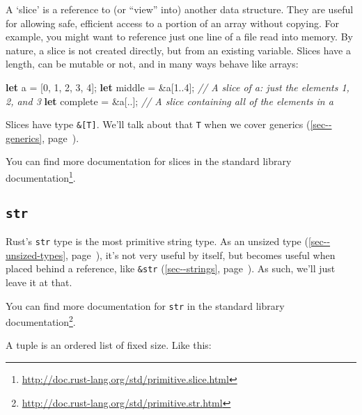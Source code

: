 \documentclass[a4paper,]{book}
\renewcommand*{\hyperref}[2][\ar]{%
  \def\ar{#2}%
  #2 (\autoref{#1}, page~\pageref{#1})}
\newenvironment{Shaded}{\begin{snugshade}}{\end{snugshade}}
\newcommand{\KeywordTok}[1]{\textcolor[rgb]{0.13,0.29,0.53}{\textbf{{#1}}}}
\newcommand{\DecValTok}[1]{\textcolor[rgb]{0.00,0.00,0.81}{{#1}}}
\newcommand{\CommentTok}[1]{\textcolor[rgb]{0.56,0.35,0.01}{\textit{{#1}}}}
\newcommand{\NormalTok}[1]{{#1}}
\renewcommand{\href}[2]{#2\footnote{\url{#1}}}
\begin{document}
A `slice' is a reference to (or ``view'' into) another data structure.
They are useful for allowing safe, efficient access to a portion of an
array without copying. For example, you might want to reference just one
line of a file read into memory. By nature, a slice is not created
directly, but from an existing variable. Slices have a length, can be
mutable or not, and in many ways behave like arrays:

\begin{Shaded}
\begin{Highlighting}[]
\KeywordTok{let} \NormalTok{a = [}\DecValTok{0}\NormalTok{, }\DecValTok{1}\NormalTok{, }\DecValTok{2}\NormalTok{, }\DecValTok{3}\NormalTok{, }\DecValTok{4}\NormalTok{];}
\KeywordTok{let} \NormalTok{middle = &a[}\DecValTok{1.}\NormalTok{.}\DecValTok{4}\NormalTok{]; }\CommentTok{// A slice of a: just the elements 1, 2, and 3}
\KeywordTok{let} \NormalTok{complete = &a[..]; }\CommentTok{// A slice containing all of the elements in a}
\end{Highlighting}
\end{Shaded}

Slices have type \texttt{\&{[}T{]}}. We'll talk about that \texttt{T}
when we cover \hyperref[sec--generics]{generics}.

You can find more documentation for slices
\href{http://doc.rust-lang.org/std/primitive.slice.html}{in the standard
library documentation}.

\subsection{\texorpdfstring{\texttt{str}}{str}}\label{str}

Rust's \texttt{str} type is the most primitive string type. As an
\hyperref[sec--unsized-types]{unsized type}, it's not very useful by
itself, but becomes useful when placed behind a reference, like
\hyperref[sec--strings]{\texttt{\&str}}. As such, we'll just leave it at
that.

You can find more documentation for \texttt{str}
\href{http://doc.rust-lang.org/std/primitive.str.html}{in the standard
library documentation}.


A tuple is an ordered list of fixed size. Like this:
\end{document}
